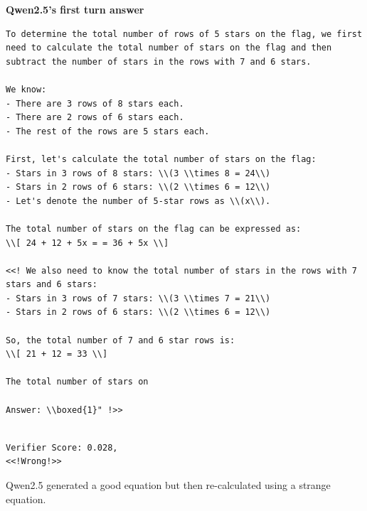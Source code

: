 \textbf{Qwen2.5's first turn answer} 
\begin{lstlisting}[breaklines=true]
To determine the total number of rows of 5 stars on the flag, we first need to calculate the total number of stars on the flag and then subtract the number of stars in the rows with 7 and 6 stars.

We know:
- There are 3 rows of 8 stars each.
- There are 2 rows of 6 stars each.
- The rest of the rows are 5 stars each.

First, let's calculate the total number of stars on the flag:
- Stars in 3 rows of 8 stars: \\(3 \\times 8 = 24\\)
- Stars in 2 rows of 6 stars: \\(2 \\times 6 = 12\\)
- Let's denote the number of 5-star rows as \\(x\\).

The total number of stars on the flag can be expressed as:
\\[ 24 + 12 + 5x = = 36 + 5x \\]

<<! We also need to know the total number of stars in the rows with 7 stars and 6 stars:
- Stars in 3 rows of 7 stars: \\(3 \\times 7 = 21\\)
- Stars in 2 rows of 6 stars: \\(2 \\times 6 = 12\\)

So, the total number of 7 and 6 star rows is:
\\[ 21 + 12 = 33 \\]

The total number of stars on

Answer: \\boxed{1}" !>>


\end{lstlisting}
\begin{lstlisting}
Verifier Score: 0.028,
<<!Wrong!>> 
\end{lstlisting}
Qwen2.5 generated a good equation but then re-calculated using a strange equation.

